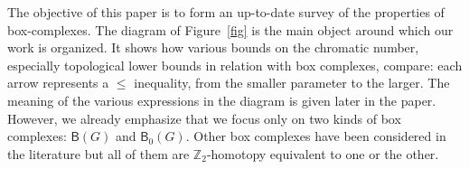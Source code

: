 \documentclass[12pt]{amsart}
\theoremstyle{definition}
\def\Z{\mathbb{Z}}
\def\B{\mathsf{B}}
\renewcommand{\leq}{\leqslant}
\newcounter{foo}
\begin{document}
The objective of this paper is to form an up-to-date survey of the properties of box-complexes. The diagram of Figure~\ref{fig} is the main object around which our work is organized. It shows how various bounds on the chromatic number, especially topological lower bounds in relation with box complexes, compare: each arrow represents a $\leq$ inequality, from the smaller parameter to the larger. The meaning of the various expressions in the diagram is given later in the paper. However, we already emphasize that we focus only on two kinds of box complexes: $\B(G)$ and $\B_0(G)$. Other box complexes have been considered in the literature but all of them are $\Z_2$-homotopy equivalent to one or the other.




\setcounter{foo}{\theequation}
\setcounter{equation}{0}
\renewcommand*\theequation{\alph{equation}}
\end{document}
